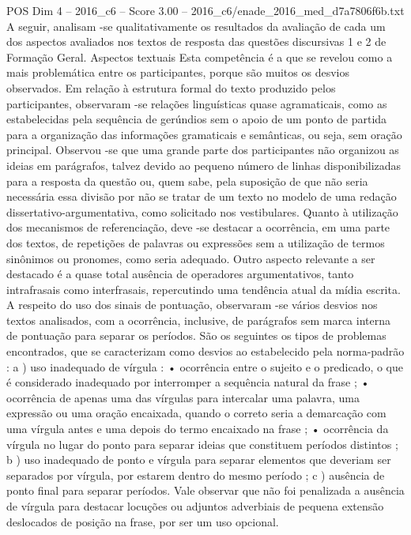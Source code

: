 \begin{textsample}{POS Dim 4 – 2016\_c6 – Score 3.00 – 2016\_c6/enade\_2016\_med\_d7a7806f6b.txt}
A seguir, analisam -se qualitativamente os resultados da avaliação de cada um dos aspectos avaliados nos textos de resposta das questões discursivas 1 e 2 de Formação Geral.
Aspectos textuais Esta competência é a que se revelou como a mais problemática entre os participantes, porque são muitos os desvios observados.
Em relação à estrutura formal do texto produzido pelos participantes, observaram -se relações linguísticas quase agramaticais, como as estabelecidas pela sequência de gerúndios sem o apoio de um ponto de partida para a organização das informações gramaticais e semânticas, ou seja, sem oração principal.
Observou -se que uma grande parte dos participantes não organizou as ideias em parágrafos, talvez devido ao pequeno número de linhas disponibilizadas para a resposta da questão ou, quem sabe, pela suposição de que não seria necessária essa divisão por não se tratar de um texto no modelo de uma redação dissertativo-argumentativa, como solicitado nos vestibulares.
Quanto à utilização dos mecanismos de referenciação, deve -se destacar a ocorrência, em uma parte dos textos, de repetições de palavras ou expressões sem a utilização de termos sinônimos ou pronomes, como seria adequado.
Outro aspecto relevante a ser destacado é a quase total ausência de operadores argumentativos, tanto intrafrasais como interfrasais, repercutindo uma tendência atual da mídia escrita.
A respeito do uso dos sinais de pontuação, observaram -se vários desvios nos textos analisados, com a ocorrência, inclusive, de parágrafos sem marca interna de pontuação para separar os períodos.
São os seguintes os tipos de problemas encontrados, que se caracterizam como desvios ao estabelecido pela norma-padrão : a ) uso inadequado de vírgula : • ocorrência entre o sujeito e o predicado, o que é considerado inadequado por interromper a sequência natural da frase ; • ocorrência de apenas uma das vírgulas para intercalar uma palavra, uma expressão ou uma oração encaixada, quando o correto seria a demarcação com uma vírgula antes e uma depois do termo encaixado na frase ; • ocorrência da vírgula no lugar do ponto para separar ideias que constituem períodos distintos ; b ) uso inadequado de ponto e vírgula para separar elementos que deveriam ser separados por vírgula, por estarem dentro do mesmo período ; c ) ausência de ponto final para separar períodos.
Vale observar que não foi penalizada a ausência de vírgula para destacar locuções ou adjuntos adverbiais de pequena extensão deslocados de posição na frase, por ser um uso opcional.

\end{textsample}
